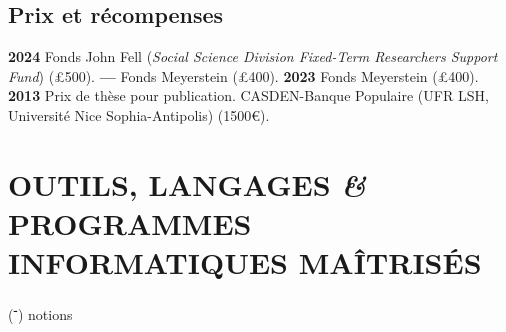 \documentclass{article}
\begin{document}
\subsection*{Prix et récompenses}

\textbf{2024} Fonds John Fell (\textit{Social Science Division Fixed-Term Researchers Support Fund}) (£500).
\smallbreak
\textbf{--- } Fonds Meyerstein (£400).
\smallbreak
\textbf{2023} Fonds Meyerstein (£400).
\smallbreak
\textbf{2013} Prix de thèse pour publication. CASDEN-Banque Populaire (UFR LSH, Université Nice Sophia-Antipolis) (1500€).


\section*{OUTILS, LANGAGES \textit{\&} PROGRAMMES INFORMATIQUES MAÎTRISÉS}
\begin{center}(\textbf{\textsuperscript{-}}) notions\end{center}
\smallbreak
\end{document}
